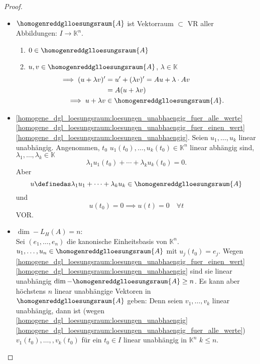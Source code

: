 \begin{proof}
  \begin{itemize}
    \item \( \homogenreddglloesungsraum{A} \) ist Vektorraum \( \subset \) VR aller Abbildungen: \( I\to \mathbb{K}^n \).
    \begin{enumerate}
      \item \( 0\in \homogenreddglloesungsraum{A} \) \checkmark
      \item \( u,v\in \homogenreddglloesungsraum{A} \), \( \lambda\in \mathbb{K} \)
      \begin{align*}
        \implies (u+\lambda v)'&=u'+(\lambda v)'=A u+\lambda\cdot A v\\
        &=A(u+\lambda v)\\
        \implies u+\lambda v&\in \homogenreddglloesungsraum{A}.
      \end{align*}
    \end{enumerate}
    \item \ref{homogene_dgl_loesungsraum:loesungen_unabhaengig_fuer_alle_werte} \timplies \ref{homogene_dgl_loesungsraum:loesungen_unabhaengig_fuer_einen_wert} \timplies \ref{homogene_dgl_loesungsraum:loesungen_unabhaengig}.
    \minisec{\ref{homogene_dgl_loesungsraum:loesungen_unabhaengig} \timplies \ref{homogene_dgl_loesungsraum:loesungen_unabhaengig_fuer_alle_werte}} Seien \( u_1,\dotsc, u_k \) linear unabhängig. Angenommen, \texists  \( t_0 \) \sd \( u_1(t_0),\dotsc,u_k(t_0)\in \mathbb{K}^n\) linear abhängig sind, \dh \texists  \( \lambda_1,\dotsc,\lambda_k\in \mathbb{K} \) \sd 
    \begin{equation*}
      \lambda_1 u_1(t_0)+\dotsb+\lambda_k u_k (t_0)=0.
    \end{equation*}
    Aber
    \begin{equation*}
      u\definedas \lambda_1 u_1+\dotsb+\lambda_k u_k \in \homogenreddglloesungsraum{A}
    \end{equation*}
    und
    \begin{equation*}
      u(t_0)=0\implies u(t)=0\quad \forall t
    \end{equation*}
    \contra VOR\@.
    \item \( \dim-{L_H(A)}=n \):\\
    Sei \( (e_1,\dotsc,e_n) \) die kanonische Einheitsbasis von \( \mathbb{K}^n \). \texists \( u_1,\dotsc,u_n\in \homogenreddglloesungsraum{A} \) mit \( u_j(t_0)=e_j \). Wegen \ref{homogene_dgl_loesungsraum:loesungen_unabhaengig_fuer_einen_wert} \timplies \ref{homogene_dgl_loesungsraum:loesungen_unabhaengig} sind sie linear unabhängig \timplies \( \dim-{\homogenreddglloesungsraum{A}}\geq n \). Es kann aber höchstens \( n \) linear unabhängige Vektoren in \( \homogenreddglloesungsraum{A} \) geben: Denn seien \( v_1,\dotsc,v_k \) linear unabhängig, dann ist (wegen \ref{homogene_dgl_loesungsraum:loesungen_unabhaengig} \timplies \ref{homogene_dgl_loesungsraum:loesungen_unabhaengig_fuer_alle_werte}) \( v_1(t_0),\dotsc,, v_k(t_0) \) für ein \( t_0\in I \) linear unabhängig in \( \mathbb{K}^n \) \timplies \( k\leq n \).
  \end{itemize}
\end{proof}
